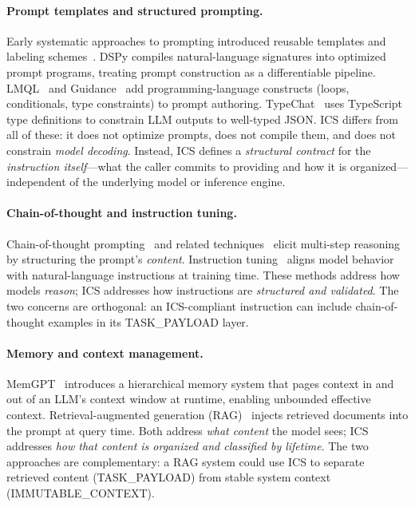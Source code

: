 \documentclass[11pt]{article}
\begin{document}
\paragraph{Prompt templates and structured prompting.}
Early systematic approaches to prompting introduced reusable templates and
labeling schemes~\citep{bach2022promptsource,sanh2022multitask}. DSPy
\citep{khattab2023dspy} compiles natural-language signatures into optimized
prompt programs, treating prompt construction as a differentiable pipeline.
LMQL~\citep{beurer2023lmql} and Guidance~\citep{guidance2023} add
programming-language constructs (loops, conditionals, type constraints) to
prompt authoring. TypeChat~\citep{typechat2023} uses TypeScript type
definitions to constrain LLM outputs to well-typed JSON. ICS differs from all
of these: it does not optimize prompts, does not compile them, and does not
constrain \emph{model decoding}. Instead, ICS defines a \emph{structural
contract} for the \emph{instruction itself}---what the caller commits to
providing and how it is organized---independent of the underlying model or
inference engine.

\paragraph{Chain-of-thought and instruction tuning.}
Chain-of-thought prompting~\citep{wei2022chain} and related
techniques~\citep{kojima2022zero,wang2022self} elicit multi-step reasoning
by structuring the prompt's \emph{content}. Instruction
tuning~\citep{ouyang2022training,wei2022finetuned} aligns model behavior with
natural-language instructions at training time. These methods address how
models \emph{reason}; ICS addresses how instructions are \emph{structured and
validated}. The two concerns are orthogonal: an ICS-compliant instruction can
include chain-of-thought examples in its TASK\_PAYLOAD layer.

\paragraph{Memory and context management.}
MemGPT~\citep{packer2023memgpt} introduces a hierarchical memory system that
pages context in and out of an LLM's context window at runtime, enabling
unbounded effective context. Retrieval-augmented generation
(RAG)~\citep{lewis2020rag} injects retrieved documents into the prompt at
query time. Both address \emph{what content} the model sees; ICS addresses
\emph{how that content is organized and classified by lifetime}. The two
approaches are complementary: a RAG system could use ICS to separate
retrieved content (TASK\_PAYLOAD) from stable system context
(IMMUTABLE\_CONTEXT).
\end{document}

